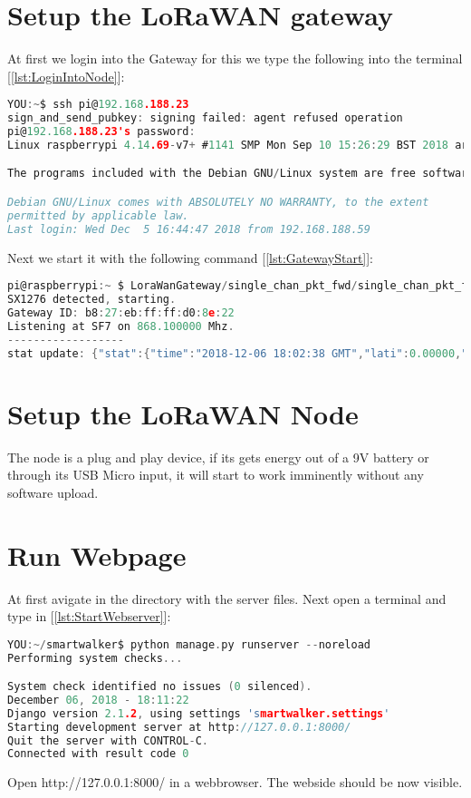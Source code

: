 \section{Setup the LoRaWAN gateway}

At first we login into the Gateway for this we type the following into the terminal [\ref{lst:LoginIntoNode}]:
\begin{lstlisting}[language=c,frame=tb,caption={Login into the Node},label=lst:LoginIntoNode]
YOU:~$ ssh pi@192.168.188.23
sign_and_send_pubkey: signing failed: agent refused operation
pi@192.168.188.23's password: 
Linux raspberrypi 4.14.69-v7+ #1141 SMP Mon Sep 10 15:26:29 BST 2018 armv7l

The programs included with the Debian GNU/Linux system are free software; the exact distribution terms for each program are described in the individual files in /usr/share/doc/*/copyright.

Debian GNU/Linux comes with ABSOLUTELY NO WARRANTY, to the extent
permitted by applicable law.
Last login: Wed Dec  5 16:44:47 2018 from 192.168.188.59
\end{lstlisting}

Next we start it with the following command [\ref{lst:GatewayStart}]:
\begin{lstlisting}[language=c,frame=tb,caption={Starting LoraWAN Gateway},label=lst:GatewayStart]
pi@raspberrypi:~ $ LoraWanGateway/single_chan_pkt_fwd/single_chan_pkt_fwd 
SX1276 detected, starting.
Gateway ID: b8:27:eb:ff:ff:d0:8e:22
Listening at SF7 on 868.100000 Mhz.
------------------
stat update: {"stat":{"time":"2018-12-06 18:02:38 GMT","lati":0.00000,"long":0.00000,"alti":0,"rxnb":0,"rxok":0,"rxfw":0,"ackr":0.0,"dwnb":0,"txnb":0,"pfrm":"Single Channel Gateway","mail":"bla@gmail.com","desc":"smart walkers!!"}}
\end{lstlisting}

\section{Setup the LoRaWAN Node}
The node is a plug and play device, if its gets energy out of a 9V battery or through its USB Micro input, it will start to work imminently without any software upload.
\newpage

\section{Run Webpage}
At first avigate in the directory with the server files.
Next open a terminal and type in [\ref{lst:StartWebserver}]: 
\begin{lstlisting}[language=c,frame=tb,caption={Starting Webpage},label=lst:StartWebserver]
YOU:~/smartwalker$ python manage.py runserver --noreload
Performing system checks...

System check identified no issues (0 silenced).
December 06, 2018 - 18:11:22
Django version 2.1.2, using settings 'smartwalker.settings'
Starting development server at http://127.0.0.1:8000/
Quit the server with CONTROL-C.
Connected with result code 0
\end{lstlisting}

Open http://127.0.0.1:8000/ in a webbrowser. The webside should be now visible.

